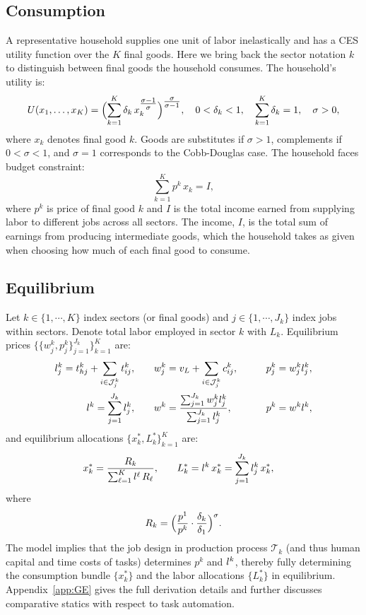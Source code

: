 \documentclass{article}
\theoremstyle{plain}
\theoremstyle{plain}
\begin{document}
\subsection{Consumption} 
\label{sec:household_GE}
A representative household supplies one unit of labor inelastically and has a CES utility function over the $K$ final goods.
Here we bring back the sector notation $k$ to distinguish between final goods the household consumes. The household's utility is:
\[
U(x_{1}, \ldots, x_{K}) = \Bigl(\sum_{k=1}^{K} \delta_k \,x_k^{\tfrac{\sigma - 1}{\sigma}}\Bigr)^{\tfrac{\sigma}{\sigma-1}},
\quad
0 < \delta_k < 1,
\quad
\sum_{k=1}^{K} \delta_k = 1,
\quad
\sigma > 0,
\]  
where $x_k$ denotes final good $k$.
Goods are substitutes if $ \sigma > 1$, complements if $0 < \sigma < 1$, and $\sigma = 1$ corresponds to the Cobb-Douglas case.  
The household faces budget constraint:  
\[
\sum_{k=1}^K p^k \,x_k = I,
\]  
where $p^k$ is price of final good $k$ and $I$ is the total income earned from supplying labor to different jobs across all sectors.  
The income, $I$, is the total sum of earnings from producing intermediate goods, which the household takes as given when choosing how much of each final good to consume.


\subsection{Equilibrium}
Let $k \in \{1, \cdots, K\}$ index sectors (or final goods) and $j \in \{1,\cdots, J_k \}$ index jobs within sectors.
Denote total labor employed in sector $k$ with $L_k$.
Equilibrium prices $\big\{ \big\{ w_j^k, p_j^k \big\}_{j=1}^{J_k} \big\}_{k=1}^K$ are: 
\begin{align*}
l_{j}^k =  t_{hj}^k + \sum_{i \in \mathcal{J}_j^k} t_{ij}^{k},
& \qquad
w_j^k =  v_L + \sum_{i \in \mathcal{J}_j^k} c_{ij}^{k}, 
& \qquad
p_j^k = w_j^k l_{j}^k, \\
l_{}^k = \sum_{j=1}^{J_k} l_{j}^k,
& \qquad
w^k = \frac{\sum_{j=1}^{J_k} w_j^k l_{j}^k}{\sum_{j=1}^{J_k} l_{j}^k},
& \qquad
p^k = w^k l_{}^k,
\end{align*}
and equilibrium allocations $\big\{ x_k^*, L_k^* \big\}_{k=1}^K$ are:
\begin{align*}
x_k^* = \frac{R_k}{\sum_{\ell=1}^K l_{}^\ell\,R_\ell},
& \qquad
L_k^* = l_{}^k\,x_k^* = \sum_{j=1}^{J_k} l_{j}^k\,x_k^*,
\end{align*}
where
\[
R_k = \Bigl(\frac{p^1}{p^k} \cdot \frac{\delta_k}{\delta_1}\Bigr)^{\sigma}.
\]
The model implies that the job design in production process $\mathcal{T}_k$ (and thus human capital and time costs of tasks) determines $p^k$ and $l_{}^k$, thereby fully determining the consumption bundle $\{x_k^*\}$ and the labor allocations $\{L_k^*\}$ in equilibrium.
Appendix~\ref{app:GE} gives the full derivation details and further discusses comparative statics with respect to task automation.
\end{document}
